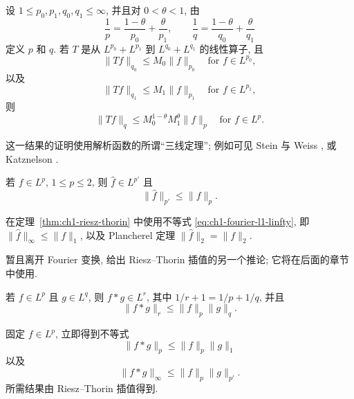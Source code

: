 \begin{Theorem}
\label{thm:ch1-riesz-thorin}
设 $1\le p_0,p_1,q_0,q_1\le\infty$, 并且对 $0<\theta<1$, 由
\[
 \frac1p=\frac{1-\theta}{p_0}+\frac\theta{p_1},
 \qquad
 \frac1q=\frac{1-\theta}{q_0}+\frac\theta{q_1}
\]
定义 $p$ 和 $q$. 若 $T$ 是从 $L^{p_0}+L^{p_1}$ 到 $L^{q_0}+L^{q_1}$ 的线性算子, 且
\[
 \|Tf\|_{q_0}\le M_0\|f\|_{p_0}\quad\text{for }f\in L^{p_0},
\]
以及
\[
 \|Tf\|_{q_1}\le M_1\|f\|_{p_1}\quad\text{for }f\in L^{p_1},
\]
则
\[
 \|Tf\|_q\le M_0^{1-\theta}M_1^\theta\|f\|_p
 \quad\text{for }f\in L^p.
\]
\end{Theorem}

这一结果的证明使用解析函数的所谓“三线定理”; 例如可见 Stein 与 Weiss , 或 Katznelson .

\begin{Corollary}
\label{cor:ch1-hausdorff-young}
若 $f\in L^p$, $1\le p\le2$, 则 $\widehat f\in L^{p'}$ 且
\[
 \|\widehat f\|_{p'}\le\|f\|_p.
\]
\end{Corollary}

\begin{Proof}
在定理~\ref{thm:ch1-riesz-thorin} 中使用不等式 \eqref{eq:ch1-fourier-l1-linfty}, 即 $\|\widehat f\|_\infty\le\|f\|_1$, 以及 Plancherel 定理 $\|\widehat f\|_2=\|f\|_2$.
\end{Proof}

\hypertarget{chapter-01-page-029}{}
暂且离开 Fourier 变换, 给出 Riesz--Thorin 插值的另一个推论; 它将在后面的章节中使用.

\begin{Corollary}
\label{cor:ch1-young-convolution}
若 $f\in L^p$ 且 $g\in L^q$, 则 $f*g\in L^r$, 其中 $1/r+1=1/p+1/q$, 并且
\[
 \|f*g\|_r\le\|f\|_p\|g\|_q.
\]
\end{Corollary}

\begin{Proof}
固定 $f\in L^p$, 立即得到不等式
\[
 \|f*g\|_p\le\|f\|_p\|g\|_1
\]
以及
\[
 \|f*g\|_\infty\le\|f\|_p\|g\|_{p'}.
\]
所需结果由 Riesz--Thorin 插值得到.
\end{Proof}

